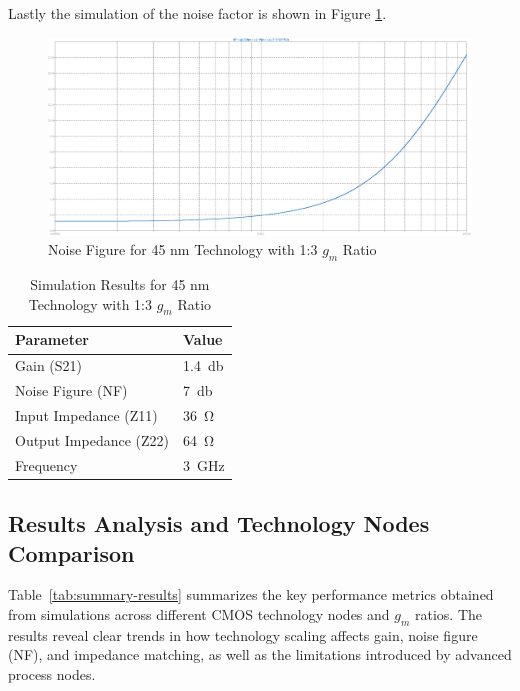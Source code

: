 Lastly the simulation of the noise factor is shown in Figure \ref{fig:Noise45nm1to3}.
\begin{figure}[H]
    \centering
    \includegraphics[width=1\textwidth]{Images/Noise_45_1To3.png}
    \caption{Noise Figure for 45 nm Technology with 1:3 $g_m$ Ratio}
    \label{fig:Noise45nm1to3}
\end{figure}

\begin{table}[H]
    \centering
    \caption{Simulation Results for 45 nm Technology with 1:3 $g_m$ Ratio}
    \begin{tabularx}{\textwidth}{>{\centering\arraybackslash}X >{\centering\arraybackslash}X }
        \toprule
        \textbf{Parameter} & \textbf{Value}\\
        \midrule
        Gain (S21) & \SI{1.4}{\decibel} \\
        \midrule
        Noise Figure (NF) & \SI{7}{\decibel} \\
        \midrule
        Input Impedance (Z11) & \SI{36}{\ohm} \\
        \midrule
        Output Impedance (Z22) & \SI{64}{\ohm} \\
        \midrule
        Frequency & \SI{3}{\giga \hertz} \\
        \bottomrule
    \end{tabularx}
    \label{tab:45nm_1ton_results}
\end{table}

\subsection{Results Analysis and Technology Nodes Comparison}

Table~\ref{tab:summary-results} summarizes the key performance metrics obtained from simulations across different CMOS technology nodes and $g_m$ ratios. The results reveal clear trends in how technology scaling affects gain, noise figure (NF), and impedance matching, as well as the limitations introduced by advanced process nodes.


